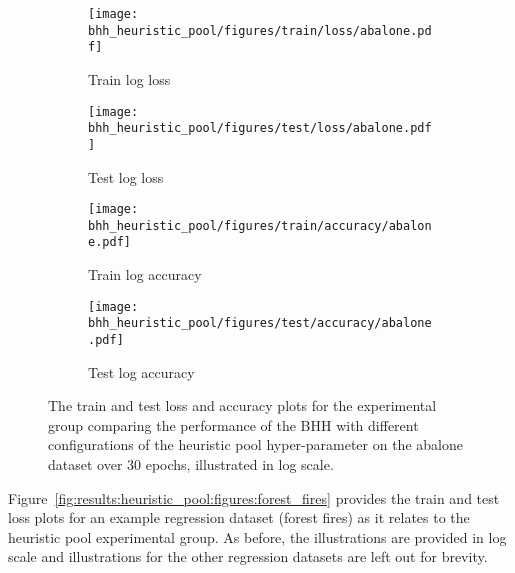 \begin{figure}[htb]
	\begin{subfigure}{0.5\textwidth}
		\centering
		\texttt{[image: bhh\_heuristic\_pool/figures/train/loss/abalone.pdf]}
		\caption{Train log loss}
		\label{fig:results:heuristic_pool:figures:loss:train:abalone}
	\end{subfigure}
	\begin{subfigure}{0.5\textwidth}
		\centering
		\texttt{[image: bhh\_heuristic\_pool/figures/test/loss/abalone.pdf]}
		\caption{Test log loss}
		\label{fig:results:heuristic_pool:figures:loss:test:abalone}
	\end{subfigure}
	\par\bigskip
	\begin{subfigure}{0.5\textwidth}
		\centering
		\texttt{[image: bhh\_heuristic\_pool/figures/train/accuracy/abalone.pdf]}
		\caption{Train log accuracy}
		\label{fig:results:heuristic_pool:figures:accuracy:train:abalone}
	\end{subfigure}
	\begin{subfigure}{0.5\textwidth}
		\centering
		\texttt{[image: bhh\_heuristic\_pool/figures/test/accuracy/abalone.pdf]}
		\caption{Test log accuracy}
		\label{fig:results:heuristic_pool:figures:accuracy:test:abalone}
	\end{subfigure}
	\par\bigskip
	\caption{The train and test loss and accuracy plots for the experimental group comparing the performance of the \acs{BHH} with different configurations of the heuristic pool hyper-parameter on the abalone dataset over 30 epochs, illustrated in log scale.}
	\label{fig:results:heuristic_pool:figures:abalone}
\end{figure}

Figure~\ref{fig:results:heuristic_pool:figures:forest_fires} provides the train and test loss plots for an example regression dataset (forest fires) as it relates to the heuristic pool experimental group. As before, the illustrations are provided in log scale and illustrations for the other regression datasets are left out for brevity.

